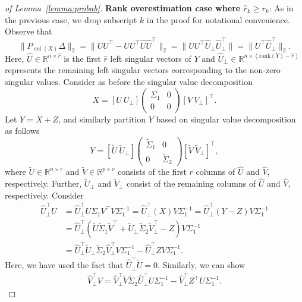 \documentclass{amsart}
\DeclareMathOperator*{\col}{col}
\begin{document}
\begin{proof}[of Lemma~\ref{lemma:probab}]
{\vspace{0.1in}
\noindent \textbf{Rank overestimation case where $\widehat r_k \geq r_k$}: As in the previous case, we drop subscript $k$ in the proof for notational convenience. Observe that
$$
\|P_{{\col (X)}}\Delta\|_2 = \|UU^{\top} -  UU^{\top}\widehat U \widehat U^{\top}\|_2 = \|UU^{\top}\widehat U_{\perp}\widehat U_{\perp}^{\top}\| = \|U^{\top}\widehat U_{\perp}^{\top}\|_2.
$$
Here, $\widehat U \in \mathbb{R}^{n \times \widehat r}$ is the first $\widehat r$ left singular vectors of $Y$ and $\widehat U_\perp \in \mathbb{R}^{n \times (\mathrm{rank}(Y) -\widehat r)}$ represents the remaining left singular vectors corresponding to the non-zero singular values. Consider as before the singular value decomposition
$$
X = [U\ U_{\perp}]\begin{pmatrix} \Sigma_1 & 0\\0&0 \end{pmatrix} [V\ V_{\perp}]^{\top}.
$$
Let $Y = X + Z$, and similarly partition $Y$ based on singular value decomposition as follows
$$
Y = [\widetilde U\ \widetilde U_{\perp}]\begin{pmatrix} \widetilde \Sigma_1 & 0\\0&\widetilde \Sigma_2 \end{pmatrix} [\widetilde V\ \widetilde V_{\perp}]^{\top},
$$
where $\widetilde U \in \mathbb{R}^{n \times r}$ and $\widetilde V \in \mathbb{R}^{p \times r}$ consists of the first $r$ columns of $\widehat U$ and $\widehat V$, respectively. Further, $\widetilde U_\perp$ and $\widetilde V_\perp$ consist of the remaining columns of $\widehat U$ and $\widehat V$, respectively. Consider
\begin{align*}
\widehat U_{\perp}^{\top}U &= \widehat U_{\perp}^{\top}U\Sigma_1V^{\top}V\Sigma_1^{-1} = \widehat U_{\perp}^{\top}(X)V\Sigma_1^{-1} =\widehat U_{\perp}^{\top}(Y - Z) V\Sigma_1^{-1} \\
&=\widehat U_{\perp}^{\top}(\widetilde U\widetilde\Sigma_1\widetilde V^{\top} + \widetilde U_{\perp}\widetilde \Sigma_2\widetilde{V}_{\perp}^{\top} - Z) V\Sigma_1^{-1} \\
&= \widehat U_{\perp}^{\top} \widetilde U_\perp \widetilde \Sigma_2 \widehat V_{\perp}^{\top}V\Sigma_1^{-1} - \widehat U_{\perp}^{\top}ZV\Sigma_1^{-1}.
\end{align*}
Here, we have used the fact that $\widehat U_\perp ^\top \widetilde U = 0$. Similarly, we can show
\begin{align*}
\widehat V_{\perp}^{\top}V = \widehat V_{\perp}^{\top} \widetilde V \widetilde \Sigma_2 \widehat U_{\perp}^{\top}U\Sigma_1^{-1} - \widehat V_{\perp}^{\top}Z^{\top}U\Sigma_{1}^{-1}.

\end{align*}}
\end{proof}
\end{document}

